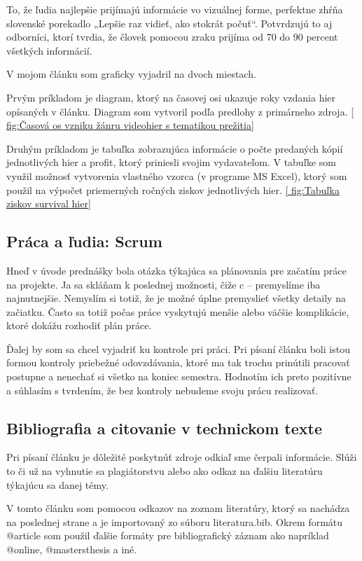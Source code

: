 \documentclass[10pt,oneoside,slovak,a4paper]{article}
\begin{document}
To, že ľudia najlepšie prijímajú informácie vo vizuálnej forme, perfektne zhŕňa slovenské porekadlo „Lepšie raz vidieť, ako stokrát počuť“. Potvrdzujú to aj odborníci, ktorí tvrdia, že človek pomocou zraku prijíma od 70 do 90 percent všetkých informácií. \cite{Regec}

V mojom článku som graficky vyjadril na dvoch miestach. 

Prvým príkladom je diagram, ktorý na časovej osi ukazuje roky vzdania hier opísaných v článku. Diagram som vytvoril podľa predlohy z primárneho zdroja. \ref{ fig:Časová os vzniku žánru videohier s tematikou prežitia}

Druhým príkladom je tabuľka zobrazujúca informácie o počte predaných kópií jednotlivých hier a profit, ktorý priniesli svojim vydavateľom. V tabuľke som využil možnosť vytvorenia vlastného vzorca (v programe MS Excel), ktorý som použil na výpočet priemerných ročných ziskov jednotlivých hier. \ref{ fig:Tabuľka ziskov survival hier}


\subsection{Práca a ľudia: Scrum}

Hneď v úvode prednášky bola otázka týkajúca sa plánovania pre začatím práce na projekte. Ja sa skláňam k poslednej možnosti, čiže c – premyslíme iba najnutnejšie. Nemyslím si totiž, že je možné úplne premyslieť všetky detaily na začiatku. Často sa  totiž počas práce vyskytujú menšie alebo väčšie komplikácie, ktoré dokážu rozhodiť plán práce.

Ďalej by som sa chcel vyjadriť ku kontrole pri práci.  Pri písaní článku boli istou formou kontroly priebežné odovzdávania, ktoré ma tak trochu prinútili pracovať postupne a nenechať si všetko na koniec semestra. Hodnotím ich preto pozitívne a súhlasím s tvrdením, že bez kontroly nebudeme svoju prácu realizovať. 


\subsection{Bibliografia a citovanie v technickom texte}
Pri písaní článku je dôležité poskytnúť zdroje odkiaľ sme čerpali informácie. Slúži to či už na vyhnutie sa plagiátorstvu alebo ako odkaz na ďalšiu literatúru týkajúcu sa danej témy.

V tomto článku som pomocou odkazov na zoznam literatúry, ktorý sa nachádza na poslednej strane a je importovaný zo súboru literatura.bib. 
Okrem formátu @article  som použil ďalšie formáty pre bibliografický záznam ako napríklad @online, @mastersthesis a iné. 
\end{document}
